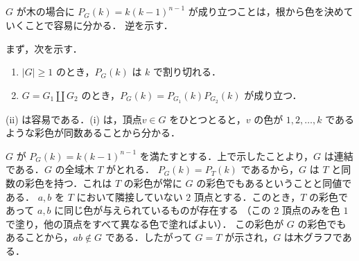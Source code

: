 \subsection{}
$G$ が木の場合に $P_G(k) = k(k-1)^{n-1}$ が成り立つことは，根から色を決めていくことで容易に分かる．
逆を示す．

まず，次を示す．
\begin{enumerate}
 \item $|G| \geq 1$ のとき，$P_G(k)$ は $k$ で割り切れる．
 \item $G = G_1\amalg G_2$ のとき，$P_G(k) = P_{G_1}(k)P_{G_2}(k)$ が成り立つ．
\end{enumerate}
(ii) は容易である．(i) は，頂点$v\in G$ をひとつとると，$v$ の色が $1,2,\ldots,k$ であるような彩色が同数あることから分かる．

$G$ が $P_G(k) = k(k-1)^{n-1}$ を満たすとする．上で示したことより，$G$ は連結である．$G$ の全域木 $T$ がとれる．
$P_G(k) = P_T(k)$ であるから，$G$ は $T$ と同数の彩色を持つ．これは $T$ の彩色が常に $G$ の彩色でもあるということと同値である．
$a,b$ を $T$ において隣接していない $2$ 頂点とする．このとき，$T$ の彩色であって $a,b$ に同じ色が与えられているものが存在する
（この $2$ 頂点のみを色 $1$ で塗り，他の頂点をすべて異なる色で塗ればよい）．
この彩色が $G$ の彩色でもあることから，$ab\notin G$ である．したがって $G=T$ が示され，$G$ は木グラフである．